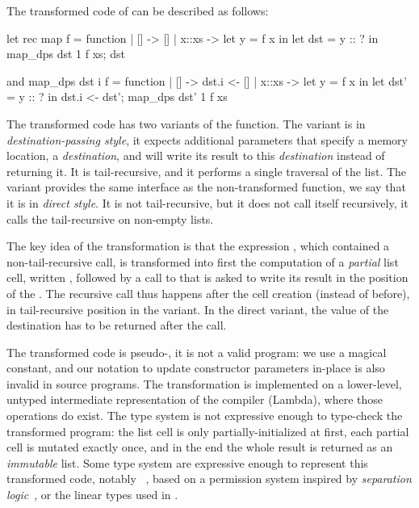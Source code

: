 The transformed code of  can be described as
follows:\\
\hspace{-1.6em}
\begin{minipage}{0.5\linewidth}
\begin{Ocaml}
let rec map f = function
| [] -> []
| x::xs ->
  let y = f x in
  let dst = y :: ? in
  map_dps dst 1 f xs;
  dst
\end{Ocaml}
\end{minipage}
\hfill
\begin{minipage}{0.5\linewidth}
\begin{Ocaml}
and map_dps dst i f = function
| [] ->
  dst.i <- []
| x::xs ->
  let y = f x in
  let dst' = y :: ? in
  dst.i <- dst';
  map_dps dst' 1 f xs
\end{Ocaml}
\end{minipage}

The transformed code has two variants of the  function. The  variant is in \emph{destination-passing style}, it expects additional parameters that specify a memory location, a \emph{destination}, and will write its result to this \emph{destination} instead of returning it. It is tail-recursive, and it performs a single traversal of the list. The  variant provides the same interface as the non-transformed function, we say that it is in \emph{direct style}. It is not tail-recursive, but it does not call itself recursively, it calls the tail-recursive  on non-empty lists.

The key idea of the transformation is that the expression , which contained a non-tail-recursive call, is transformed into first the computation of a \emph{partial} list cell, written , followed by a call to  that is asked to write its result in the position of the . The recursive call thus happens after the cell creation (instead of before), in tail-recursive position in the  variant. In the direct variant, the value of the destination  has to be returned after the call.

The transformed code is pseudo-\OCaml, it is not a valid \OCaml
program: we use a magical  constant, and our notation
 to update constructor parameters in-place is also
invalid in source programs. The transformation is implemented on
a lower-level, untyped intermediate representation of the \OCaml
compiler (Lambda), where those operations do exist. The \OCaml type
system is not expressive enough to type-check the transformed program:
the list cell is only partially-initialized at first, each partial
cell is mutated exactly once, and in the end the whole result is
returned as an \emph{immutable} list. Some type system are expressive
enough to represent this transformed code, notably \Mezzo~\citep*{mezzo-2016}, based on a permission system inspired by \emph{separation logic}~\citep*{seplog-cacm-2019}, or the linear types used in \citet*{minamide-98}.

